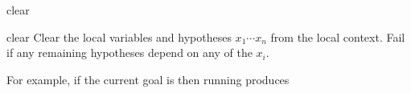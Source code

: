 \begin{tactic}{clear}
  \begin{tsyntax}[empty]{clear}
  Clear the local variables and hypotheses $x_1 \cdots x_n$ from the
  local context. Fail if any remaining hypotheses depend on any of the
  $x_i$.

  For example, if the current goal is
   then
  running 
  produces
  \end{tsyntax}
\end{tactic}
